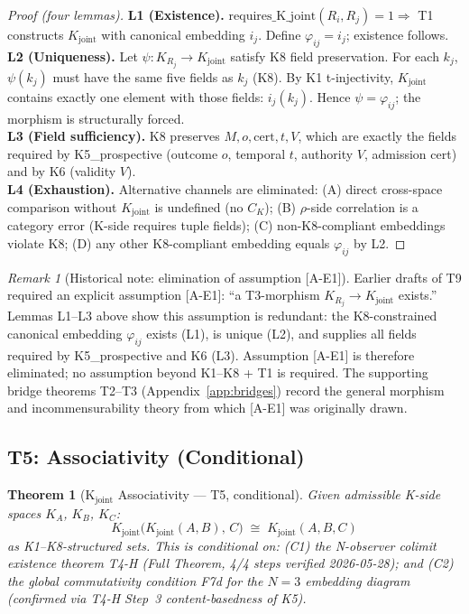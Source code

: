 \documentclass[12pt,a4paper]{article}
\theoremstyle{plain}
\newtheorem{theorem}{Theorem}[section]
\theoremstyle{definition}
\theoremstyle{remark}
\newtheorem{remark}{Remark}[section]
\newcommand{\Kjoint}{K_{\mathrm{joint}}}
\newcommand{\phiij}{\varphi_{ij}}
\newcommand{\CK}{C_K}
\begin{document}
\begin{proof}[Proof (four lemmas)]
\textbf{L1 (Existence).}
$\mathrm{requires\_K\_joint}(R_i,R_j)=1 \Rightarrow$ T1 constructs
$\Kjoint$ with canonical embedding $i_j$. Define $\phiij = i_j$; existence
follows. \\
\textbf{L2 (Uniqueness).}
Let $\psi\colon K_{R_j} \to \Kjoint$ satisfy K8 field preservation.
For each $k_j$, $\psi(k_j)$ must have the same five fields as $k_j$
(K8). By K1 t-injectivity, $\Kjoint$ contains exactly one element with
those fields: $i_j(k_j)$. Hence $\psi = \phiij$; the morphism is
structurally forced. \\
\textbf{L3 (Field sufficiency).}
K8 preserves $M, o, \mathrm{cert}, t, V$, which are exactly the fields
required by K5\_prospective (outcome $o$, temporal $t$, authority $V$,
admission cert) and by K6 (validity $V$). \\
\textbf{L4 (Exhaustion).}
Alternative channels are eliminated: (A) direct cross-space comparison
without $\Kjoint$ is undefined (no $\CK$); (B) $\rho$-side correlation
is a category error (K-side requires tuple fields); (C) non-K8-compliant
embeddings violate K8; (D) any other K8-compliant embedding equals
$\phiij$ by L2.
\end{proof}

\begin{remark}[Historical note: elimination of assumption {[A-E1]}]
Earlier drafts of T9 required an explicit assumption {[A-E1]}: ``a
T3-morphism $K_{R_j}\to\Kjoint$ exists.'' Lemmas L1--L3 above show this
assumption is redundant: the K8-constrained canonical embedding $\phiij$
exists (L1), is unique (L2), and supplies all fields required by
K5\_prospective and K6 (L3). Assumption {[A-E1]} is therefore
eliminated; no assumption beyond K1--K8 + T1 is required. The supporting
bridge theorems T2--T3 (Appendix~\ref{app:bridges}) record the general
morphism and incommensurability theory from which {[A-E1]} was originally
drawn.
\end{remark}

\subsection{T5: Associativity (Conditional)}

\begin{theorem}[K$_{\mathrm{joint}}$ Associativity --- T5, conditional]
\label{thm:T5}
Given admissible K-side spaces $K_A$, $K_B$, $K_C$:
\[
  \Kjoint\!\bigl(\Kjoint(A,B),\, C\bigr) \;\cong\; \Kjoint(A,B,C)
\]
as K1--K8-structured sets. This is conditional on: \textup{(C1)} the
N-observer colimit existence theorem T4-H (Full Theorem, 4/4 steps
verified 2026-05-28); and \textup{(C2)} the global commutativity condition
F7d for the $N=3$ embedding diagram (confirmed via T4-H Step~3
content-basedness of K5).
\end{theorem}
\end{document}
